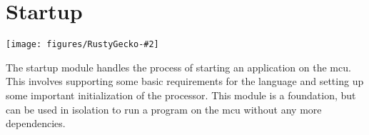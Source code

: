 


\newcommand{\corechapter}[3]{
  \chapter{#1}
  \label{chap:#2}
  \begin{center}
    \texttt{[image: figures/RustyGecko-\#2]}
  \end{center}
  \hfill \break
  \hfill \break
  \hfill \break
#3
}

\corechapter{Startup}{startup}{%
  The startup module handles the process of starting an {\rust} application on the \gls{mcu}.
  This involves supporting some basic requirements for the language and setting up some important initialization of the processor.
  This module is a foundation, but can be used in isolation to run a program on the \gls{mcu} without any more dependencies.
}


